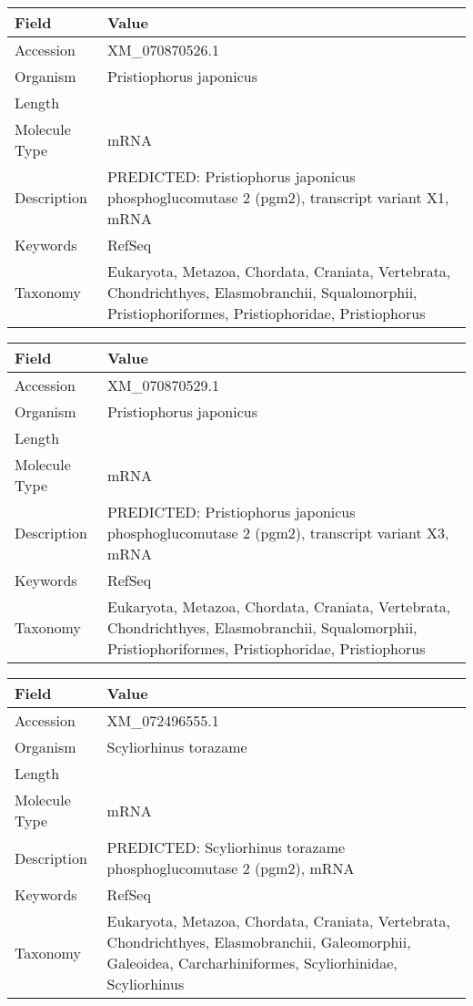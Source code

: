 \documentclass[10pt]{article}
\begin{document}
{\footnotesize
\begin{longtable}{>{\raggedright\arraybackslash}p{4.5cm} >{\raggedright\arraybackslash}p{11.5cm}}
\textbf{Field} & \textbf{Value} \\
\hline
Accession & XM\_070870526.1 \\
Organism & Pristiophorus japonicus \\
Length & 4942 \\
Molecule Type & mRNA \\
Description & PREDICTED: Pristiophorus japonicus phosphoglucomutase 2 (pgm2), transcript variant X1, mRNA \\
Keywords & RefSeq \\
Taxonomy & Eukaryota, Metazoa, Chordata, Craniata, Vertebrata, Chondrichthyes, Elasmobranchii, Squalomorphii, Pristiophoriformes, Pristiophoridae, Pristiophorus \\
\end{longtable}
}

{\footnotesize
\begin{longtable}{>{\raggedright\arraybackslash}p{4.5cm} >{\raggedright\arraybackslash}p{11.5cm}}
\textbf{Field} & \textbf{Value} \\
\hline
Accession & XM\_070870529.1 \\
Organism & Pristiophorus japonicus \\
Length & 1611 \\
Molecule Type & mRNA \\
Description & PREDICTED: Pristiophorus japonicus phosphoglucomutase 2 (pgm2), transcript variant X3, mRNA \\
Keywords & RefSeq \\
Taxonomy & Eukaryota, Metazoa, Chordata, Craniata, Vertebrata, Chondrichthyes, Elasmobranchii, Squalomorphii, Pristiophoriformes, Pristiophoridae, Pristiophorus \\
\end{longtable}
}

{\footnotesize
\begin{longtable}{>{\raggedright\arraybackslash}p{4.5cm} >{\raggedright\arraybackslash}p{11.5cm}}
\textbf{Field} & \textbf{Value} \\
\hline
Accession & XM\_072496555.1 \\
Organism & Scyliorhinus torazame \\
Length & 6044 \\
Molecule Type & mRNA \\
Description & PREDICTED: Scyliorhinus torazame phosphoglucomutase 2 (pgm2), mRNA \\
Keywords & RefSeq \\
Taxonomy & Eukaryota, Metazoa, Chordata, Craniata, Vertebrata, Chondrichthyes, Elasmobranchii, Galeomorphii, Galeoidea, Carcharhiniformes, Scyliorhinidae, Scyliorhinus \\
\end{longtable}
}
\end{document}
